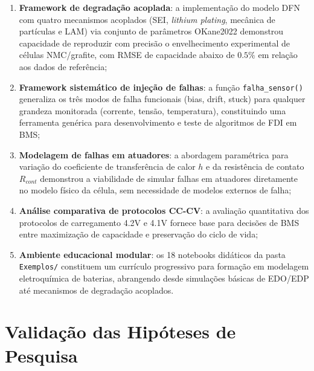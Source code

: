 \documentclass[
    12pt,
    openright,
    twoside,
    a4paper,
    brazil,
    english
]{abntex2}
\begin{document}
\begin{enumerate}
  \item \textbf{Framework de degradação acoplada}: a implementação do modelo
        DFN com quatro mecanismos acoplados (SEI, \textit{lithium plating},
        mecânica de partículas e LAM) via conjunto de parâmetros OKane2022
        demonstrou capacidade de reproduzir com precisão o envelhecimento
        experimental de células NMC/grafite, com RMSE de capacidade abaixo de
        $0.5\%$ em relação aos dados de referência;

  \item \textbf{Framework sistemático de injeção de falhas}: a função
        \texttt{falha\_sensor()} generaliza os três modos de falha funcionais
        (bias, drift, stuck) para qualquer grandeza monitorada (corrente, tensão,
        temperatura), constituindo uma ferramenta genérica para desenvolvimento
        e teste de algoritmos de FDI em BMS;

  \item \textbf{Modelagem de falhas em atuadores}: a abordagem paramétrica para
        variação do coeficiente de transferência de calor $h$ e da resistência
        de contato $R_{cont}$ demonstrou a viabilidade de simular falhas em
        atuadores diretamente no modelo físico da célula, sem necessidade de
        modelos externos de falha;

  \item \textbf{Análise comparativa de protocolos CC-CV}: a avaliação quantitativa
        dos protocolos de carregamento 4.2V e 4.1V fornece base para decisões
        de BMS entre maximização de capacidade e preservação do ciclo de vida;

  \item \textbf{Ambiente educacional modular}: os 18 notebooks didáticos da pasta
        \texttt{Exemplos/} constituem um currículo progressivo para formação em
        modelagem eletroquímica de baterias, abrangendo desde simulações
        básicas de EDO/EDP até mecanismos de degradação acoplados.
\end{enumerate}

\section{Validação das Hipóteses de Pesquisa}
\end{document}
